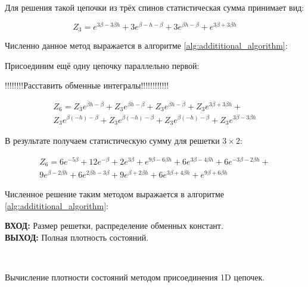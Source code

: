 \documentclass[utf8, babel, sor, jor, amsmath, amssymb, reprint]{elsarticle} %
\begin{document}
Для решения такой цепочки из трёх спинов статистическая сумма принимает вид:

\begin{equation}
	Z_3 = e^{3\beta - 3\beta h} + 3e^{\beta - h - \beta} + 3e^{\beta h - \beta} + e^{3\beta + 3\beta h}
	\label{eq:stat_3}
\end{equation}


Численно данное метод выражается в алгоритме \ref{alg:addititional_algorithm}:

Присоединим ещё одну цепочку параллельно первой:

!!!!!!!!Расставить обменные интегралы!!!!!!!!!!!!

\begin{equation}
	\label{eq:stat_3_un}
	\begin{alignedat}{2}
	Z_6 = Z_3 e^{\beta  h-\beta }+Z_3 e^{\beta  h-\beta }+Z_3 e^{\beta  h-\beta }+Z_3 e^{3 \beta +3 \beta  h}+ \\
	Z_3 e^{\beta  (-h)-\beta }+Z_3 e^{\beta  (-h)-\beta }+Z_3 e^{\beta  (-h)-\beta }+Z_3 e^{3 \beta -3 \beta  h}
	\end{alignedat}
\end{equation}

В результате получаем статистическую сумму для решетки $3 \times 2$:

\begin{equation}
	\label{eq:stat_3_res}
	\begin{alignedat}{2}
		Z_6 = 6 e^{-5 \beta }+12 e^{-\beta }+2 e^{3 \beta }+e^{9 \beta -6 \beta  h}+6 e^{3 \beta -4 \beta  h}+6 e^{-3 \beta -2 \beta  h}+\\
		9 e^{\beta -2 \beta  h}+6 e^{2 \beta  h-3 \beta }+9 e^{\beta +2 \beta  h}+6 e^{3 \beta +4 \beta  h}+e^{9 \beta +6 \beta  h}
	\end{alignedat}
\end{equation}

Численное решение таким методом выражается в алгоритме \ref{alg:addititional_algorithm}:


\begin{algorithm}[H]
	\textbf{ВХОД:} Размер решетки, распределение обменных констант.\\
	\textbf{ВЫХОД:} Полная плотность состояний.
	\begin{algorithmic}
		{
			{
			}
			\ENDFOR\\
		}
		\ENDFOR
	\end{algorithmic}
	\caption{Вычисление плотности состояний методом присоединения 1D цепочек.}
	\label{alg:addititional_algorithm}
\end{algorithm}
				
\end{document}
